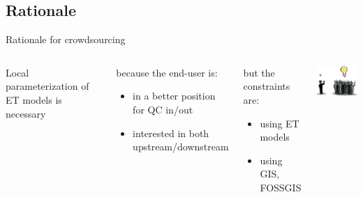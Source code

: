 \documentclass[xcolor=dvipsnames,beamer]{beamer} %
\begin{document}
\subsection{Rationale}
\begin{frame}[fragile]{Rationale for crowdsourcing}

\begin{columns}[l]
Local parameterization of ET models is necessary\newline\linebreak

\begin{block}{because the end-user is:}
\begin{itemize}
 \item in a better position for QC in/out
 \item interested in both upstream/downstream
\end{itemize}
\end{block}

\begin{block}{but the constraints are:}
\begin{itemize}
 \item using ET models
 \item using GIS, FOSSGIS
\end{itemize}
\end{block}
\begin{center}
 \includegraphics[width=3.5cm]{crowdsourcing}
\end{center}
\end{columns}

\end{frame}
\end{document}
